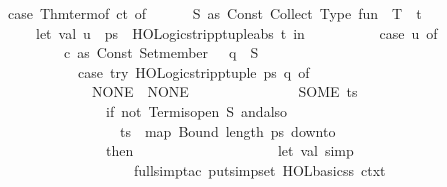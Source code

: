 \begin{isabellebody}
\ \ \ \ {\isacharparenleft}{\kern0pt}case\ Thm{\isachardot}{\kern0pt}term{\isacharunderscore}{\kern0pt}of\ ct\ of\isanewline
\ \ \ \ \ \ S\ as\ Const\ {\isacharparenleft}{\kern0pt}\isactrlconstUNDERSCOREname {\isasymopen}Collect{\isasymclose}{\isacharcomma}{\kern0pt}\ Type\ {\isacharparenleft}{\kern0pt}\isactrltypeUNDERSCOREname {\isasymopen}fun{\isasymclose}{\isacharcomma}{\kern0pt}\ {\isacharbrackleft}{\kern0pt}{\isacharunderscore}{\kern0pt}{\isacharcomma}{\kern0pt}\ T{\isacharbrackright}{\kern0pt}{\isacharparenright}{\kern0pt}{\isacharparenright}{\kern0pt}\ {\isachardollar}{\kern0pt}\ t\ {\isacharequal}{\kern0pt}{\isachargreater}{\kern0pt}\isanewline
\ \ \ \ \ \ \ \ let\ val\ {\isacharparenleft}{\kern0pt}u{\isacharcomma}{\kern0pt}\ {\isacharunderscore}{\kern0pt}{\isacharcomma}{\kern0pt}\ ps{\isacharparenright}{\kern0pt}\ {\isacharequal}{\kern0pt}\ HOLogic{\isachardot}{\kern0pt}strip{\isacharunderscore}{\kern0pt}ptupleabs\ t\ in\isanewline
\ \ \ \ \ \ \ \ \ \ {\isacharparenleft}{\kern0pt}case\ u\ of\isanewline
\ \ \ \ \ \ \ \ \ \ \ \ {\isacharparenleft}{\kern0pt}c\ as\ Const\ {\isacharparenleft}{\kern0pt}\isactrlconstUNDERSCOREname {\isasymopen}Set{\isachardot}{\kern0pt}member{\isasymclose}{\isacharcomma}{\kern0pt}\ {\isacharunderscore}{\kern0pt}{\isacharparenright}{\kern0pt}{\isacharparenright}{\kern0pt}\ {\isachardollar}{\kern0pt}\ q\ {\isachardollar}{\kern0pt}\ S{\isacharprime}{\kern0pt}\ {\isacharequal}{\kern0pt}{\isachargreater}{\kern0pt}\isanewline
\ \ \ \ \ \ \ \ \ \ \ \ \ \ {\isacharparenleft}{\kern0pt}case\ try\ {\isacharparenleft}{\kern0pt}HOLogic{\isachardot}{\kern0pt}strip{\isacharunderscore}{\kern0pt}ptuple\ ps{\isacharparenright}{\kern0pt}\ q\ of\isanewline
\ \ \ \ \ \ \ \ \ \ \ \ \ \ \ \ NONE\ {\isacharequal}{\kern0pt}{\isachargreater}{\kern0pt}\ NONE\isanewline
\ \ \ \ \ \ \ \ \ \ \ \ \ \ {\isacharbar}{\kern0pt}\ SOME\ ts\ {\isacharequal}{\kern0pt}{\isachargreater}{\kern0pt}\isanewline
\ \ \ \ \ \ \ \ \ \ \ \ \ \ \ \ \ \ if\ not\ {\isacharparenleft}{\kern0pt}Term{\isachardot}{\kern0pt}is{\isacharunderscore}{\kern0pt}open\ S{\isacharprime}{\kern0pt}{\isacharparenright}{\kern0pt}\ andalso\isanewline
\ \ \ \ \ \ \ \ \ \ \ \ \ \ \ \ \ \ \ \ ts\ {\isacharequal}{\kern0pt}\ map\ Bound\ {\isacharparenleft}{\kern0pt}length\ ps\ downto\ {}{\isacharparenright}{\kern0pt}\isanewline
\ \ \ \ \ \ \ \ \ \ \ \ \ \ \ \ \ \ then\isanewline
\ \ \ \ \ \ \ \ \ \ \ \ \ \ \ \ \ \ \ \ let\ val\ simp\ {\isacharequal}{\kern0pt}\isanewline
\ \ \ \ \ \ \ \ \ \ \ \ \ \ \ \ \ \ \ \ \ \ full{\isacharunderscore}{\kern0pt}simp{\isacharunderscore}{\kern0pt}tac\ {\isacharparenleft}{\kern0pt}put{\isacharunderscore}{\kern0pt}simpset\ HOL{\isacharunderscore}{\kern0pt}basic{\isacharunderscore}{\kern0pt}ss\ ctxt\isanewline

\end{isabellebody}

